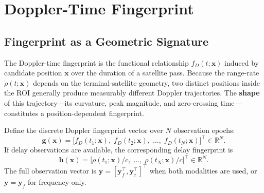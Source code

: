 \section{Doppler-Time Fingerprint}\label{sec:dtf}

\subsection{Fingerprint as a Geometric Signature}
The Doppler-time fingerprint is the functional relationship
$f_D(t; \mathbf{x})$ induced by candidate position $\mathbf{x}$ over the
duration of a satellite pass.  Because the range-rate $\dot{\rho}(t; \mathbf{x})$
depends on the terminal-satellite geometry, two distinct positions inside the
ROI generally produce measurably different Doppler trajectories.  The
\textbf{shape} of this trajectory---its curvature, peak magnitude, and
zero-crossing time---constitutes a position-dependent fingerprint.

Define the discrete Doppler fingerprint vector over $N$ observation epochs:
\begin{equation}
  \mathbf{g}(\mathbf{x})
  = \bigl[
      f_D(t_1; \mathbf{x}),\;
      f_D(t_2; \mathbf{x}),\;
      \ldots,\;
      f_D(t_N; \mathbf{x})
    \bigr]^{\top}
  \in \mathbb{R}^{N}.
  \label{eq:doppler_fingerprint}
\end{equation}
If delay observations are available, the corresponding delay fingerprint is
\begin{equation}
  \mathbf{h}(\mathbf{x})
  = \bigl[
      \rho(t_1; \mathbf{x})/c,\;
      \ldots,\;
      \rho(t_N; \mathbf{x})/c
    \bigr]^{\top}
  \in \mathbb{R}^{N}.
  \label{eq:delay_fingerprint}
\end{equation}
The full observation vector is $\mathbf{y} = [\mathbf{y}_f^{\top},\mathbf{y}_\tau^{\top}]^{\top}$
when both modalities are used, or $\mathbf{y} = \mathbf{y}_f$ for frequency-only.


